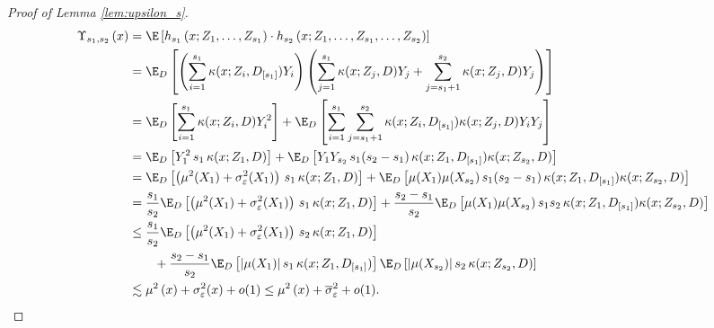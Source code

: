 \begin{proof}[Proof of Lemma \ref{lem:upsilon_s}]
	\begin{equation}
		\begin{aligned}
			\Upsilon_{s_1, s_2}\left(x\right)
			 & = \E\left[h_{s_1}\left(x; Z_1, \ldots,  Z_{s_1}\right) \cdot
			h_{s_2}\left(x; Z_1, \ldots,Z_{s_1}, \ldots, Z_{s_2}\right)\right]                                                                             \\
			 & = \E_{D}\left[
				\left(\sum_{i = 1}^{s_1} \kappa(x; Z_{i}, D_{[s_1]})Y_{i}\right)
				\left(\sum_{j = 1}^{s_1}\kappa(x; Z_j, D)Y_j + \sum_{j = s_1 + 1}^{s_2}\kappa(x; Z_j, D)Y_j\right)
			\right]                                                                                                                                                                            \\
			 & = \E_{D}\left[\sum_{i = 1}^{s_1} \kappa(x; Z_{i}, D) Y_{i}^2\right]
			+ \E_{D}\left[\sum_{i = 1}^{s_1}\sum_{j = s_1 + 1}^{s_2}\kappa(x; Z_{i}, D_{[s_1]})\kappa(x; Z_j, D) Y_{i} Y_j\right]                              \\
			 & = \E_{D}\left[Y_1^2 \, s_1 \, \kappa(x; Z_1, D)\right]
			+ \E_{D}\left[Y_{1} Y_{s_2} \, s_1 (s_2 - s_1) \, \kappa(x; Z_1, D_{[s_1]})\kappa(x; Z_{s_2}, D)\right]                                        \\
			 & = \E_{D}\left[\left(\mu^2(X_1) + \sigma^2_{\varepsilon}(X_1)\right) \, s_1 \, \kappa(x; Z_1, D)\right]
			+ \E_{D}\left[\mu(X_1) \mu(X_{s_2}) \, s_1 (s_2 - s_1) \, \kappa(x; Z_1, D_{[s_1]})\kappa(x; Z_{s_2}, D)\right]              \\
			 & = \frac{s_1}{s_2}\E_{D}\left[\left(\mu^2(X_1) + \sigma^2_{\varepsilon}(X_1)\right) \, s_1 \, \kappa(x; Z_1, D)\right]
			+ \frac{s_2 - s_1}{s_2}\E_{D}\left[\mu(X_1) \mu(X_{s_2}) \, s_1 s_2 \, \kappa(x; Z_1, D_{[s_1]})\kappa(x; Z_{s_2}, D)\right] \\
			 & \leq \frac{s_1}{s_2} \E_{D}\left[\left(\mu^2(X_1) + \sigma^2_{\varepsilon}(X_1)\right) \, s_2 \, \kappa(x; Z_1, D)\right]                   \\
			 & \quad \quad + \frac{s_2 - s_1}{s_2}\E_{D}\left[|\mu(X_1)| \, s_1 \, \kappa(x; Z_1, D_{[s_1]})\right]
			\E_{D}\left[|\mu(X_{s_2})| \, s_2 \, \kappa(x; Z_{s_2}, D)\right]                                                                                       \\
			 & \lesssim \mu^{2}\left(x\right) + \sigma^2_{\varepsilon}(x) + o(1)
			\leq \mu^{2}\left(x\right) + \overline{\sigma}^2_{\varepsilon} + o(1).
		\end{aligned}
	\end{equation}
\end{proof}

